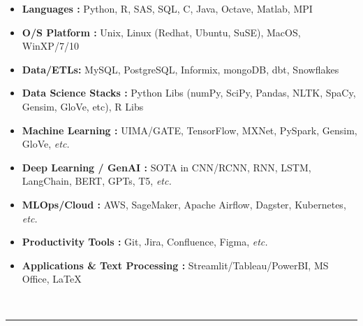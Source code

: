 \documentclass[oneside,a4,10pt]{article} %
\begin{document}
{\begin{minipage}[t][\textheight-2\fboxsep-2\fboxrule][t]{\dimexpr0.40\textwidth-2\fboxrule-2\fboxsep\relax}
        \begin{itemize} \setlength{\itemsep}{-4pt} %
         \item {\bf Languages :} Python, R, SAS, SQL, C, Java, Octave, {\sc Matlab, MPI}
         \item {\bf O/S Platform :} Unix, Linux (Redhat, Ubuntu, SuSE), MacOS, WinXP/7/10
         \item {\bf Data/ETLs:} MySQL, PostgreSQL, Informix, mongoDB, dbt, Snowflakes
         \item {\bf Data Science Stacks :} Python Libs (numPy, SciPy, Pandas, NLTK, SpaCy, Gensim, GloVe, etc), R Libs
         \item {\bf Machine Learning :} UIMA/GATE, TensorFlow, MXNet, PySpark, Gensim, GloVe, {\it etc.}
         \item {\bf Deep Learning / GenAI :} SOTA in CNN/RCNN, RNN, LSTM, LangChain, BERT, GPTs, T5, {\it etc.}
         \item {\bf MLOps/Cloud :} AWS, SageMaker, Apache Airflow, Dagster, Kubernetes, {\it etc.} 
         \item {\bf Productivity Tools :} Git, Jira, Confluence, Figma,  {\it etc.} 
         \item {\bf Applications \& Text Processing :} Streamlit/Tableau/PowerBI, MS Office, \LaTeX\ 
        \end{itemize}%

        \vspace{1pt} \\
        \rule{\linewidth}{0.4pt}
        \vfill
    \end{minipage}
}%
\hfill
\end{document}
